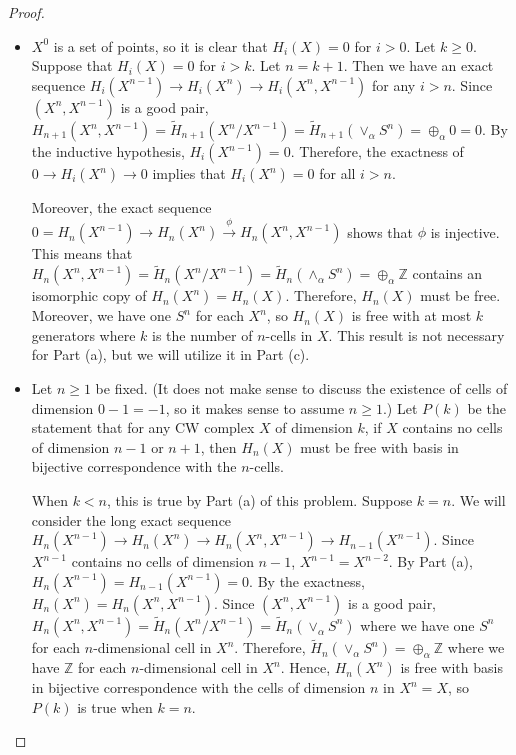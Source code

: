 \documentclass[12pt, psamsfonts]{amsart}
\theoremstyle{definition}
\theoremstyle{remark}
\numberwithin{equation}{section}
\begin{document}
\begin{proof}
$ $
  \begin{itemize}
    \item
      $X^0$ is a set of points, so it is clear that $H_i(X) = 0$ for $i > 0$.
      Let $k \geq 0$.
      Suppose that $H_i(X) = 0$ for $i > k$.
      Let $n = k + 1$.
      Then we have an exact sequence $H_{i}(X^{n - 1}) \rightarrow H_{i}(X^n) \rightarrow H_{i}(X^n, X^{n - 1})$ for any $i > n$.
      Since $(X^n, X^{n - 1})$ is a good pair, $H_{n + 1}(X^n, X^{n - 1}) = \tilde{H}_{n + 1}(X^n / X^{n - 1}) = \tilde{H}_{n + 1}(\vee_{\alpha} S^n) = \oplus_{\alpha} 0 = 0$.
      By the inductive hypothesis, $H_i(X^{n - 1}) = 0$.
      Therefore, the exactness of $0 \rightarrow H_i(X^n) \rightarrow 0$ implies that $H_i(X^n) = 0$ for all $i > n$.

      Moreover, the exact sequence $0 = H_n(X^{n - 1}) \rightarrow H_n(X^n) \xrightarrow{\phi} H_n(X^n, X^{n - 1})$ shows that $\phi$ is injective.
      This means that $H_n(X^n, X^{n - 1}) = \tilde{H}_n(X^n / X^{n - 1}) = \tilde{H}_n(\wedge_{\alpha} S^n) = \oplus_{\alpha} \mathbb{Z}$ contains an isomorphic copy of $H_n(X^n) = H_n(X)$.
      Therefore, $H_n(X)$ must be free.
      Moreover, we have one $S^n$ for each $X^n$, so $H_n(X)$ is free with at most $k$ generators where $k$ is the number of $n$-cells in $X$.
      This result is not necessary for Part (a), but we will utilize it in Part (c).
    \item
      Let $n \geq 1$ be fixed.
      (It does not make sense to discuss the existence of cells of dimension $0 - 1 = -1$, so it makes sense to assume $n \geq 1$.)
      Let $P(k)$ be the statement that for any CW complex $X$ of dimension $k$, if $X$ contains no cells of dimension $n - 1$ or $n + 1$, then $H_n(X)$ must be free with basis in bijective correspondence with the $n$-cells.

      When $k < n$, this is true by Part (a) of this problem.
      Suppose $k = n$.
      We will consider the long exact sequence $H_n(X^{n - 1}) \rightarrow H_n(X^n) \rightarrow H_n(X^n, X^{n - 1}) \rightarrow H_{n - 1}(X^{n - 1})$.
      Since $X^{n - 1}$ contains no cells of dimension $n - 1$, $X^{n - 1} = X^{n - 2}$.
      By Part (a), $H_n(X^{n - 1}) = H_{n - 1}(X^{n - 1}) = 0$.
      By the exactness, $H_n(X^n) = H_n(X^n, X^{n - 1})$.
      Since $(X^n, X^{n - 1})$ is a good pair, $H_n(X^n, X^{n - 1}) = \tilde{H}_n(X^n / X^{n - 1}) = \tilde{H}_n(\vee_{\alpha} S^n)$ where we have one $S^n$ for each $n$-dimensional cell in $X^n$.
      Therefore, $\tilde{H}_n(\vee_{\alpha} S^n) = \oplus_{\alpha} \mathbb{Z}$ where we have $\mathbb{Z}$ for each $n$-dimensional cell in $X^n$.
      Hence, $H_n(X^n)$ is free with basis in bijective correspondence with the cells of dimension $n$ in $X^n = X$, so $P(k)$ is true when $k = n$.


\end{itemize}
\end{proof}
\end{document}
